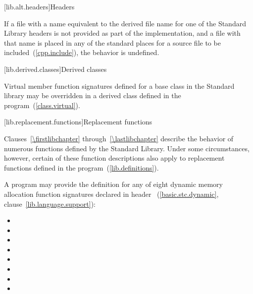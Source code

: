 [lib.alt.headers]{Headers}

\pnum
If a file with a name
%
equivalent to the derived file name for one of the \Cpp Standard Library headers
is not provided as part of the implementation, and a file with that name
is placed in any of the standard places for a source file to be included~(\ref{cpp.include}),
the behavior is undefined.%
%

[lib.derived.classes]{Derived classes}

\pnum
Virtual member function signatures defined
%
for a base class in the \Cpp Standard
%
%
library may be overridden in a derived class defined in the program~(\ref{class.virtual}).

[lib.replacement.functions]{Replacement functions}

\pnum
{}%
Clauses~\ref{\firstlibchapter} through~\ref{\lastlibchapter}
describe the behavior of numerous functions defined by
the \Cpp Standard Library.
Under some circumstances,
%
however, certain of these function descriptions also apply to replacement functions defined
in the program~(\ref{lib.definitions}).

\pnum
A \Cpp program may provide the definition for any of eight
dynamic memory allocation function signatures declared in header
~(\ref{basic.stc.dynamic}, clause~\ref{lib.language.support}):

\begin{itemize}
\item
{}%
%
\item
{}
\item
{}%
%
\item
{}
\item
{}%
%
\item
{}
\item
{}%
%
\item
{}
\end{itemize}

